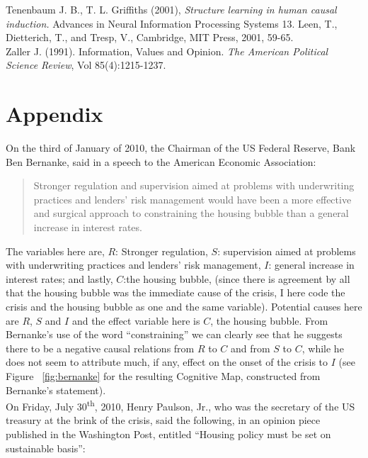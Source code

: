 \documentclass[12pt]{article}
\newcommand{\ts}{\textsuperscript}
\begin{document}
Tenenbaum J. B., T. L. Griffiths (2001), \textit{Structure learning in human causal induction.} Advances in Neural Information Processing Systems 13. Leen, T., Dietterich, T., and Tresp, V., Cambridge, MIT Press, 2001, 59-65.
\\


Zaller J. (1991). Information, Values and Opinion. \textit{The American Political Science Review}, Vol 85(4):1215-1237.


\section*{Appendix}
On the third of January of 2010, the Chairman of the US Federal Reserve, Bank Ben Bernanke, said in a speech to the American Economic Association:
\begin{quotation}
Stronger regulation and supervision aimed at problems with underwriting practices and lenders' risk management would have been a more effective and surgical approach to constraining the housing bubble than a  general increase in interest rates.
\end{quotation}

The variables here are, $R$: Stronger regulation, $S$: supervision aimed at problems with underwriting practices and lenders' risk management, $I$: general increase in interest rates; and lastly, $C$:the housing bubble, (since there is agreement by all that the housing bubble was the immediate cause of the crisis, I here code the crisis and the housing bubble as one and the same variable). Potential causes here are $R$, $S$ and $I$ and the effect variable here is $C$, the housing bubble. From Bernanke's use of the word ``constraining'' we can clearly see that he suggests there to be a negative causal relations from $R$ to $C$ and from $S$ to $C$, while he does not seem to attribute much, if any, effect on the onset of the crisis to $I$ (see Figure ~\ref{fig:bernanke} for the resulting Cognitive Map, constructed from Bernanke's statement).\\

On Friday, July 30\ts{th}, 2010, Henry Paulson, Jr., who was the secretary of the US treasury at the brink of the crisis, said the following, in an opinion piece published in the Washington Post, entitled ``Housing policy must be set on sustainable basis'':
\end{document}
